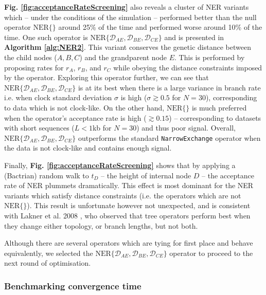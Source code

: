 \documentclass[10pt,letterpaper]{article}
\begin{document}
\textbf{Fig. \ref{fig:acceptanceRateScreening}} also reveals a cluster of NER variants which -- under the conditions of the simulation --  performed better than the null operator $\text{NER}\{\}$ around 25\% of the time and performed worse around 10\% of the time. 
One such operator is  $\text{NER}\{\mathcal{D}_{AE}, \mathcal{D}_{BE}, \mathcal{D}_{CE}\}$ and is presented in \textbf{Algorithm \ref{alg:NER2}}. 
This variant conserves the genetic distance between the child nodes ($A, B, C$) and the grandparent node $E$. This is performed by proposing rates for $r_A$, $r_B$, and $r_C$ while obeying the distance constraints imposed by the operator. Exploring this operator further, we can see that $\text{NER}\{\mathcal{D}_{AE}, \mathcal{D}_{BE}, \mathcal{D}_{CE}\}$ is at its best when there is a large variance in branch rate i.e. when clock standard deviation $\sigma$ is high ($\sigma \gtrsim 0.5$ for $N=30$), corresponding to data which is not clock-like. On the other hand, $\text{NER}\{\}$ is much preferred when the operator's acceptance rate is high ($\gtrsim 0.15$) -- corresponding to datasets with short sequences ($L < 1$kb for $N=30$) and thus poor signal.  
Overall, $\text{NER}\{\mathcal{D}_{AE}, \mathcal{D}_{BE}, \mathcal{D}_{CE}\}$ outperforms the standard \texttt{NarrowExchange} operator when the data is not clock-like and contains enough signal. 




Finally, \textbf{Fig. \ref{fig:acceptanceRateScreening}} shows that by applying a (Bactrian) random walk to $t_D$ -- the height of internal node $D$ -- the acceptance rate of NER plummets dramatically. 
This effect is most dominant for the NER variants which satisfy distance constraints (i.e. the operators which are not $\text{NER}\{\}$). This result is unfortunate however not unexpected, and is consistent with Lakner et al. 2008 \cite{lakner2008efficiency}, who observed that tree operators perform best when they change either topology, or branch lengths, but not both.



Although there are several operators which are tying for first place and behave equivalently, we selected the $\text{NER}\{\mathcal{D}_{AE}, \mathcal{D}_{BE}, \mathcal{D}_{CE}\}$ operator to proceed to the next round of optimisation.





\subsubsection*{Benchmarking convergence time}
\end{document}

